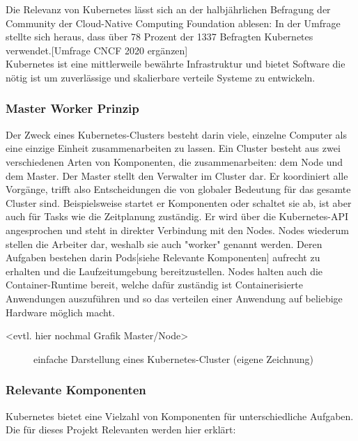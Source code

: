 \documentclass[a4paper,12pt]{scrartcl}
\begin{document}
Die Relevanz von Kubernetes lässt sich an der halbjährlichen Befragung der Community der Cloud-Native Computing Foundation ablesen:
In der Umfrage stellte sich heraus, dass über 78 Prozent der 1337 Befragten Kubernetes verwendet.[Umfrage CNCF 2020 ergänzen]\\


Kubernetes ist eine mittlerweile bewährte Infrastruktur und bietet Software die nötig ist um zuverlässige und skalierbare verteile Systeme zu entwickeln. \cite{Burns.2019} \\
\subsubsection{Master Worker Prinzip}
Der Zweck eines Kubernetes-Clusters besteht darin viele, einzelne Computer als eine einzige Einheit zusammenarbeiten zu lassen.
Ein Cluster besteht aus zwei verschiedenen Arten von Komponenten, die zusammenarbeiten:
dem Node und dem Master.
Der Master stellt den Verwalter im Cluster dar. Er koordiniert alle Vorgänge, trifft also Entscheidungen die von globaler Bedeutung für das gesamte Cluster sind. Beispielsweise startet er Komponenten oder schaltet sie ab, ist aber auch für Tasks wie die Zeitplanung zuständig. Er wird über die Kubernetes-API angesprochen und steht in direkter Verbindung mit den Nodes.\cite{.20200530T15:19:3404:00} \cite{.20200316T05:14:35+01:00}
Nodes wiederum stellen die Arbeiter dar, weshalb sie auch "worker" genannt werden. Deren Aufgaben bestehen darin Pods[siehe Relevante Komponenten] aufrecht zu erhalten und die Laufzeitumgebung bereitzustellen. Nodes halten auch die Container-Runtime bereit, welche dafür zuständig ist Containerisierte Anwendungen auszuführen und so das verteilen einer Anwendung auf beliebige Hardware möglich macht.

<evtl. hier nochmal Grafik Master/Node>


\begin{figure}[htbp]
  \centering
  
  \caption{einfache Darstellung eines Kubernetes-Cluster (eigene Zeichnung)}
\end{figure}

\pagebreak

\subsubsection{Relevante Komponenten}

Kubernetes bietet eine Vielzahl von Komponenten für unterschiedliche Aufgaben. Die für dieses Projekt Relevanten werden hier erklärt:
\end{document}
